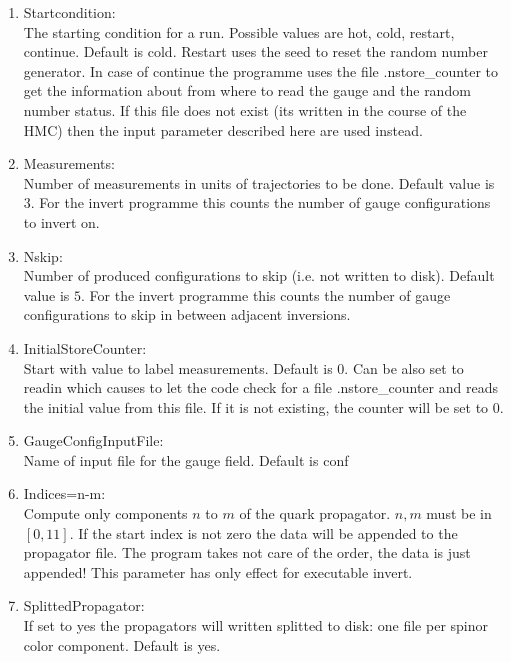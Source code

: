 \begin{enumerate}
\item {\ttfamily Startcondition}:\\
  The starting condition for a run. Possible values are {\ttfamily
    hot, cold, restart, continue}. Default is {\ttfamily
    cold}. Restart uses the seed to reset the random number
  generator. In case of {\ttfamily continue} the programme uses the
  file {\ttfamily .nstore\_counter} to get the information about from
  where to read the gauge and the random number status. If this file
  does not exist (its written in the course of the HMC) then the input
  parameter described here are used instead.

\item {\ttfamily Measurements}:\\
  Number of measurements in units of trajectories to be done. Default
  value is $3$. For the {\ttfamily invert} programme this counts the
  number of gauge configurations to invert on.

\item {\ttfamily Nskip}:\\
  Number of produced configurations to skip (i.e. not written to
  disk). Default value is $5$. For the {\ttfamily invert} programme
  this counts the number of gauge configurations to skip in between
  adjacent inversions.

\item {\ttfamily InitialStoreCounter}:\\
  Start with value to label measurements. Default is $0$. Can be also
  set to {\ttfamily readin} which causes to let the code check for a
  file {\ttfamily .nstore\_counter} and reads the initial value from
  this file. If it is not existing, the counter will be set to $0$.

\item {\ttfamily GaugeConfigInputFile}:\\
  Name of input file for the gauge field. Default is {\ttfamily conf}

\item {\ttfamily Indices=n-m}:\\
  Compute only components $n$ to $m$ of the quark propagator. $n,m$ must
  be in $[0,11]$. If the start index is not zero the data will be
  appended to the propagator file. The program takes not care of the
  order, the data is just appended! This parameter has only
  effect for executable {\ttfamily invert}.

\item {\ttfamily SplittedPropagator}:\\
  If set to yes the propagators will written splitted to disk: one
  file per spinor color component. Default is {\ttfamily yes}.


\end{enumerate}
